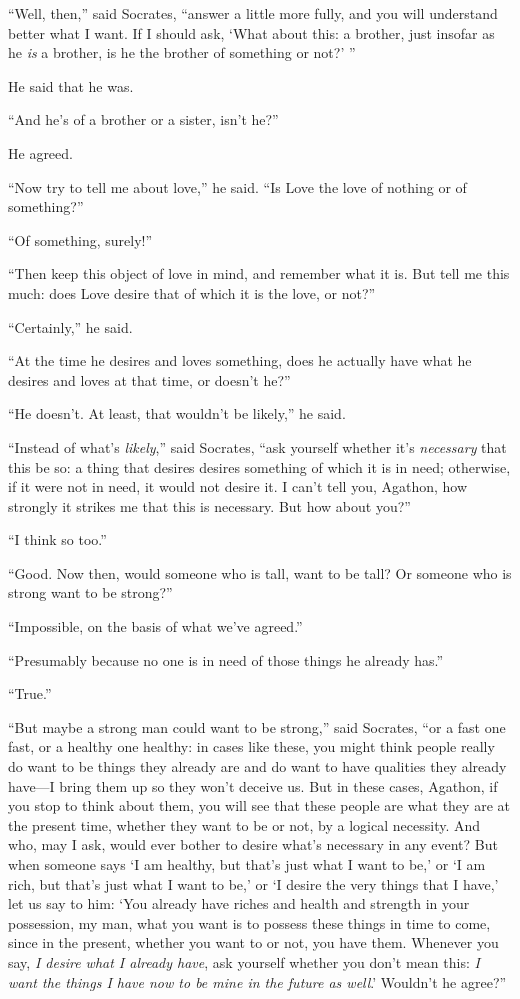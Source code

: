 “Well, then,” said Socrates, “answer a little more fully, and you will
understand better what I want. If I should ask, ‘What about this: a
brother, just insofar as he {\em is} a brother, is he the brother of
something or not?’ ”

He said that he was.

“And he’s of a brother or a sister, isn’t he?”

He agreed.

“Now try to tell me about love,” he said. “Is Love the love of nothing
or of something?”

 “Of something, surely!”

“Then keep this object of love in mind, and remember what it
is. But tell me this
much: does Love desire that of which it is the love, or not?”

“Certainly,” he said.

“At the time he desires and loves something, does he actually have what
he desires and loves at that time, or doesn’t he?”

“He doesn’t. At least, that wouldn’t be likely,” he said.

“Instead of what’s {\em likely},” said Socrates, “ask yourself whether
it’s {\em necessary}  that this be so: a thing that desires
desires something of which it is in need; otherwise, if it were not in
need, it would not desire it. I can’t tell you, Agathon, how strongly it
strikes me that this is necessary. But how about you?”

“I think so too.”

“Good. Now then, would someone who is tall, want to be tall? Or someone
who is strong want to be strong?”

“Impossible, on the basis of what we’ve agreed.”

“Presumably because no one is in need of those things he already has.”

“True.”

“But maybe a strong man could want to be strong,” said Socrates, “or a
fast one fast, or a healthy one healthy: in cases like these, you might
 think people really do want to be things they already are and do
want to have qualities they already have---I bring them up so they won’t
deceive us. But in these cases, Agathon, if you stop to think about
them, you will see that these people are what they are at the present
time, whether they want to be or not, by a logical necessity. And who,
may I ask, would ever bother to desire what’s necessary in any event?
But when someone says ‘I am healthy, but that’s just what I want to be,’
or ‘I am rich, but that’s just what I want to be,’ or ‘I desire the very
things that I have,’ let us say  to him: ‘You already have riches
and health and strength in your possession, my man, what you want is to
possess these things in time to come, since in the present, whether you
want to or not, you have them. Whenever you say, {\em I desire what I
already have}, ask yourself whether you don’t mean this: {\em I want the
things I have now to be mine in the future as well}.’ Wouldn’t he
agree?”

